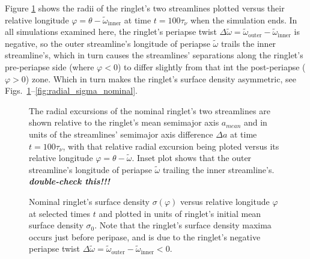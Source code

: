 \documentclass[preprint]{aastex62}
\begin{document}
Figure \ref{fig:nominal_streamlines} shows the radii of the ringlet's two streamlines plotted
versus their relative longitude $\varphi=\theta-\tilde{\omega}_{\text{inner}}$ at time $t=100\tau_\nu$
when the simulation ends. In all simulations examined here, the ringlet's periapse twist 
$\Delta\tilde{\omega} = \tilde{\omega}_{\text{outer}} - \tilde{\omega}_{\text{inner}}$ is negative,
so the outer streamline's longitude of periapse $\tilde{\omega}$ trails
the inner streamline's, which in turn causes the streamlines' separations along
the ringlet's pre-periapse side (where $\varphi < 0$) to differ slightly from that int the post-periapse ($\varphi>0$) zone.
Which in turn makes the ringlet's surface density asymmetric, see Figs.\ \ref{fig:nominal_streamlines}--\ref{fig:radial_sigma_nominal}.

\begin{figure}
    \caption{
        \label{fig:nominal_streamlines}
        The radial excursions of the nominal ringlet's two streamlines are shown relative to the ringlet's mean semimajor axis
        $a_{mean}$ and in units of the streamlines'
        semimajor axis difference $\Delta a$ at time $t=100\tau_\nu$, with that relative radial excursion
        being ploted versus its relative longitude $\varphi=\theta-\tilde{\omega}$. Inset plot
        shows that the outer streamline's longitude of periapse $\tilde{\omega}$ trailing the inner streamline's.
        {\em\bf double-check this!!!}
    }
\end{figure}

\begin{figure}
    \caption{
        \label{fig:nominal_sigma_vs_longitude}
        Nominal ringlet's surface density $\sigma(\varphi)$ versus relative
        longitude $\varphi$ at selected times $t$ and plotted in units of ringlet's initial
        mean surface density $\sigma_0$. Note that the ringlet's surface
        density maxima occurs just before peripase,  and is due to the ringlet's
        negative periapse twist 
        $\Delta\tilde{\omega} = \tilde{\omega}_{\text{outer}} - \tilde{\omega}_{\text{inner}} < 0$.
    }
\end{figure}
\end{document}
